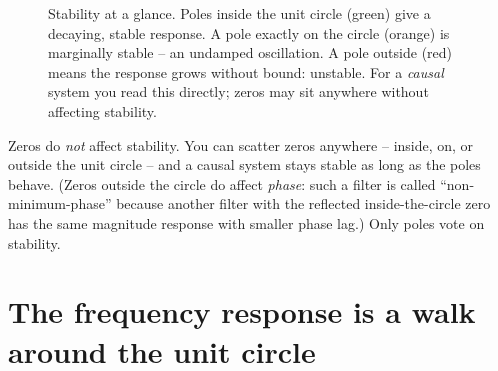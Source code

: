 \begin{figure}[H]
\centering
{}
\caption{Stability at a glance. Poles inside the unit circle (green) give a decaying,
stable response. A pole exactly on the circle (orange) is marginally stable -- an
undamped oscillation. A pole outside (red) means the response grows without bound:
unstable. For a \emph{causal} system you read this directly; zeros may sit anywhere
without affecting stability.}
\label{ch15:fig-stability}
\end{figure}

\begin{trapbox}
Zeros do \emph{not} affect stability. You can scatter zeros anywhere -- inside, on, or
outside the unit circle -- and a causal system stays stable as long as the poles behave.
(Zeros outside the circle do affect \emph{phase}: such a filter is called ``non-minimum-phase''
because another filter with the reflected inside-the-circle zero has the same magnitude response with smaller phase lag.) Only poles vote on stability.
\end{trapbox}

\section{The frequency response is a walk around the unit circle}
\label{ch15:freq-response}


